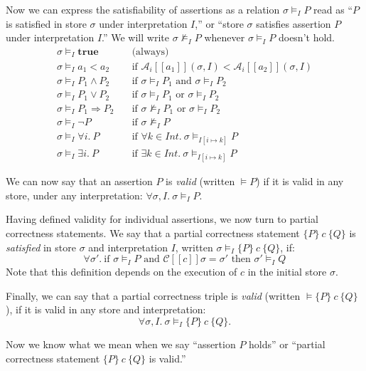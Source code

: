 Now we can express the satisfiability of assertions as a relation $\sigma \models_I P$ read as
``$P$ is satisfied in store $\sigma$ under interpretation $I$,'' or ``store $\sigma$ satisfies
assertion $P$ under interpretation $I$.'' We will write $\sigma \not\models_I P$ whenever
$\sigma \models_I P$ doesn't hold.
\begin{align*}
\sigma \models_I \mathbf{true} \quad & \text{(always)} \\
\sigma \models_I a_1 < a_2 \quad & \text{if } \mathcal{A}_i[\![a_1]\!](\sigma, I) <
\mathcal{A}_i[\![a_2]\!](\sigma, I) \\
\sigma \models_I P_1 \wedge P_2 \quad & \text{if } \sigma \models_I P_1 \text{ and } \sigma
\models_I P_2 \\
\sigma \models_I P_1 \vee P_2 \quad & \text{if } \sigma \models_I P_1 \text{ or } \sigma
\models_I P_2 \\
\sigma \models_I P_1 \Rightarrow P_2 \quad & \text{if } \sigma \not\models_I P_1 \text{ or }
\sigma \models_I P_2 \\
\sigma \models_I \neg P \quad & \text{if } \sigma \not\models_I P \\
\sigma \models_I \forall i.\ P \quad & \text{if } \forall k \in \mathit{Int}.\ \sigma
\models_{I[i \mapsto k]} P \\
\sigma \models_I \exists i.\ P \quad & \text{if } \exists k \in \mathit{Int}.\ \sigma
\models_{I[i \mapsto k]} P
\end{align*}

We can now say that an assertion $P$ is \emph{valid} (written $\models P$) if it is valid in any
store, under any interpretation: $\forall \sigma, I.\ \sigma \models_I P$.

Having defined validity for individual assertions, we now turn to partial correctness
statements. We say that a partial correctness statement $\{P\}\ c\ \{Q\}$ is \emph{satisfied}
in store $\sigma$ and interpretation $I$, written $\sigma \models_I \{P\}\ c\ \{Q\}$, if:
\[
\forall \sigma'.\ \text{if } \sigma \models_I P \text{ and } \mathcal{C}[\![c]\!]\sigma =
\sigma' \text{ then } \sigma' \models_I Q
\]
Note that this definition depends on the execution of $c$ in the initial store $\sigma$.

Finally, we can say that a partial correctness triple is \emph{valid} (written $\models \{P\}\
c\ \{Q\}$), if it is valid in any store and interpretation:
\[
\forall \sigma, I.\ \sigma \models_I \{P\}\ c\ \{Q\}.
\]

Now we know what we mean when we say ``assertion $P$ holds'' or ``partial correctness statement
$\{P\}\ c\ \{Q\}$ is valid.''

